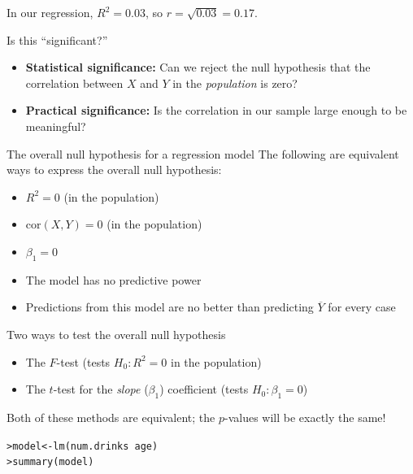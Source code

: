 \documentclass{beamer}\usepackage[]{graphicx}\usepackage[]{color}
\makeatletter
\newcommand{\hlopt}[1]{\textcolor[rgb]{1,0.894,0.769}{#1}}%
\newcommand{\hlstd}[1]{\textcolor[rgb]{1,0.894,0.769}{#1}}%
\newcommand{\hlkwb}[1]{\textcolor[rgb]{0.804,0.776,0.451}{#1}}%
\newcommand{\hlkwd}[1]{\textcolor[rgb]{1,0.78,0.769}{#1}}%
\newenvironment{kframe}{%
 \def\at@end@of@kframe{}%
 \ifinner\ifhmode%
  \def\at@end@of@kframe{\end{minipage}}%
  \begin{minipage}{\columnwidth}%
 \fi\fi%
 \def\FrameCommand##1{\hskip\@totalleftmargin \hskip-\fboxsep
 \colorbox{shadecolor}{##1}\hskip-\fboxsep
     \hskip-\linewidth \hskip-\@totalleftmargin \hskip\columnwidth}%
 \MakeFramed {\advance\hsize-\width
   \@totalleftmargin\z@ \linewidth\hsize
   \@setminipage}}%
 {\par\unskip\endMakeFramed%
 \at@end@of@kframe}
\newenvironment{knitrout}{}{} %
\makeatother
\begin{document}
\begin{darkframes}
    \begin{frame}
      In our regression, $R^2=0.03$, so $r=\sqrt{0.03}=0.17$.

      Is this ``significant?''
      \pause
      \begin{itemize}[<+->]
        \item \textbf{Statistical significance:} Can we reject the null hypothesis that the correlation between $X$ and $Y$ in the \emph{population} is zero?
        \item \textbf{Practical significance:} Is the correlation in our sample large enough to be meaningful?
      \end{itemize}
    \end{frame}

    \begin{frame}{The overall null hypothesis for a regression model}
      The following are equivalent ways to express the overall null hypothesis:
      \begin{itemize}[<+->]
        \item $R^2=0$ (in the population)
        \item $\text{cor}(X,Y)=0$ (in the population)
        \item $\beta_1=0$
        \item The model has no predictive power
        \item Predictions from this model are no better than predicting $\overline Y$ for every case
      \end{itemize}
    \end{frame}

    \begin{frame}{Two ways to test the overall null hypothesis}
      \begin{itemize}
        \item The $F$-test (tests $H_0:R^2=0$ in the population)
        \item The $t$-test for the \emph{slope} ($\beta_1$) coefficient (tests $H_0:\beta_1=0$)
      \end{itemize}
      \pause
      Both of these methods are equivalent; the $p$-values will be exactly the same!
    \end{frame}

    \begin{frame}[fragile]
      \fontsize{9}{9}\selectfont
\begin{knitrout}
\begin{kframe}
\begin{alltt}
\hlstd{> }\hlstd{model} \hlkwb{<-} \hlkwd{lm}\hlstd{(num.drinks} \hlopt{~} \hlstd{age)}
\hlstd{> }\hlkwd{summary}\hlstd{(model)}
\end{alltt}
\begin{verbatim}


\end{verbatim}
\end{kframe}
\end{knitrout}
\end{frame}
\end{darkframes}
\end{document}
